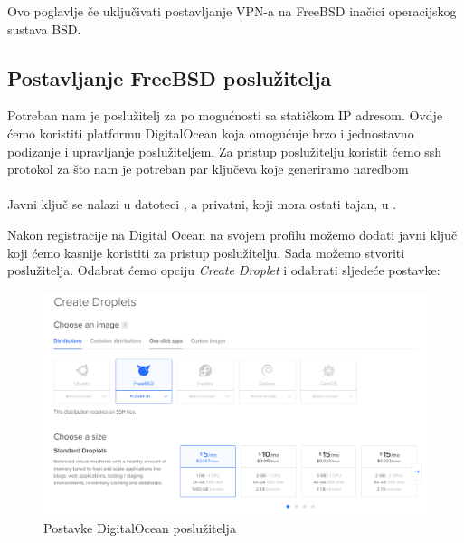 Ovo poglavlje če uključivati postavljanje VPN-a na FreeBSD inačici operacijskog
sustava BSD. 

\subsection{Postavljanje FreeBSD poslužitelja}
    Potreban nam je poslužitelj za po mogućnosti sa statičkom IP adresom. Ovdje
    ćemo koristiti platformu DigitalOcean koja omogućuje brzo i jednostavno
    podizanje i upravljanje poslužiteljem. Za pristup poslužitelju koristit ćemo
    ssh protokol za što nam je potreban par ključeva koje generiramo naredbom \\

    \noindent
     \\

    \noindent
    Javni ključ se nalazi u datoteci , a privatni, koji
    mora ostati tajan, u .

    Nakon registracije na Digital Ocean na svojem profilu možemo dodati javni ključ
    koji ćemo kasnije koristiti za pristup poslužitelju. Sada možemo stvoriti
    poslužitelja. Odabrat ćemo opciju
    \textit{Create Droplet} i odabrati sljedeće postavke:

    \begin{figure}[h]
        \centering
        \includegraphics[scale=0.35]{slike/postavkeDOserver}
        \caption{Postavke DigitalOcean poslužitelja}
    \end{figure}

